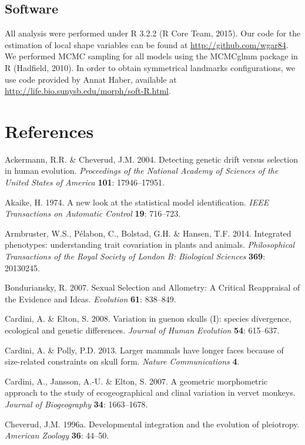 \documentclass[12pt,]{article}
\begin{document}
\subsection{Software}\label{software}

All analysis were performed under R 3.2.2 (R Core Team, 2015). Our code
for the estimation of local shape variables can be found at
\url{http://github.com/wgar84}. We performed MCMC sampling for all
models using the MCMCglmm package in R (Hadfield, 2010). In order to
obtain symmetrical landmarks configurations, we use code provided by
Annat Haber, available at
\url{http://life.bio.sunysb.edu/morph/soft-R.html}.

\section*{References}\label{references}

Ackermann, R.R. \& Cheverud, J.M. 2004. Detecting genetic drift versus
selection in human evolution. \emph{Proceedings of the National Academy
of Sciences of the United States of America} \textbf{101}: 17946--17951.

Akaike, H. 1974. A new look at the statistical model identification.
\emph{IEEE Transactions on Automatic Control} \textbf{19}: 716--723.

Armbruster, W.S., Pélabon, C., Bolstad, G.H. \& Hansen, T.F. 2014.
Integrated phenotypes: understanding trait covariation in plants and
animals. \emph{Philosophical Transactions of the Royal Society of London
B: Biological Sciences} \textbf{369}: 20130245.

Bonduriansky, R. 2007. Sexual Selection and Allometry: A Critical
Reappraisal of the Evidence and Ideas. \emph{Evolution} \textbf{61}:
838--849.

Cardini, A. \& Elton, S. 2008. Variation in guenon skulls (I): species
divergence, ecological and genetic differences. \emph{Journal of Human
Evolution} \textbf{54}: 615--637.

Cardini, A. \& Polly, P.D. 2013. Larger mammals have longer faces
because of size-related constraints on skull form. \emph{Nature
Communications} \textbf{4}.

Cardini, A., Jansson, A.-U. \& Elton, S. 2007. A geometric morphometric
approach to the study of ecogeographical and clinal variation in vervet
monkeys. \emph{Journal of Biogeography} \textbf{34}: 1663--1678.

Cheverud, J.M. 1996a. Developmental integration and the evolution of
pleiotropy. \emph{American Zoology} \textbf{36}: 44--50.
\end{document}
